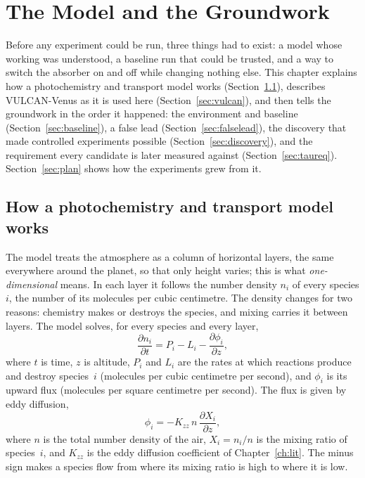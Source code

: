 
\chapter{The Model and the Groundwork}
\label{ch:model}

Before any experiment could be run, three things had to exist: a model whose working
was understood, a baseline run that could be trusted, and a way to switch the absorber
on and off while changing nothing else. This chapter explains how a photochemistry and
transport model works (Section~\ref{sec:how}), describes VULCAN-Venus as it is used here
(Section~\ref{sec:vulcan}), and then tells the groundwork in the order it happened: the
environment and baseline (Section~\ref{sec:baseline}), a false lead
(Section~\ref{sec:falselead}), the discovery that made controlled experiments possible
(Section~\ref{sec:discovery}), and the requirement every candidate is later measured
against (Section~\ref{sec:taureq}). Section~\ref{sec:plan} shows how the experiments
grew from it.

\section{How a photochemistry and transport model works}
\label{sec:how}

The model treats the atmosphere as a column of horizontal layers, the same everywhere
around the planet, so that only height varies; this is what \emph{one-dimensional}
means. In each layer it follows the number density $n_i$ of every species $i$, the
number of its molecules per cubic centimetre. The density changes for two reasons:
chemistry makes or destroys the species, and mixing carries it between layers. The
model solves, for every species and every layer,
\begin{equation}
  \frac{\partial n_i}{\partial t} = P_i - L_i - \frac{\partial \phi_i}{\partial z},
  \label{eq:continuity}
\end{equation}
where $t$ is time, $z$ is altitude, $P_i$ and $L_i$ are the rates at which reactions
produce and destroy species~$i$ (molecules per cubic centimetre per second), and
$\phi_i$ is its upward flux (molecules per square centimetre per second). The flux is
given by eddy diffusion,
\begin{equation}
  \phi_i = -K_{zz}\, n \,\frac{\partial X_i}{\partial z},
  \label{eq:flux}
\end{equation}
where $n$ is the total number density of the air, $X_i = n_i/n$ is the mixing ratio of
species~$i$, and $K_{zz}$ is the eddy diffusion coefficient of Chapter~\ref{ch:lit}. The
minus sign makes a species flow from where its mixing ratio is high to where it is low.

